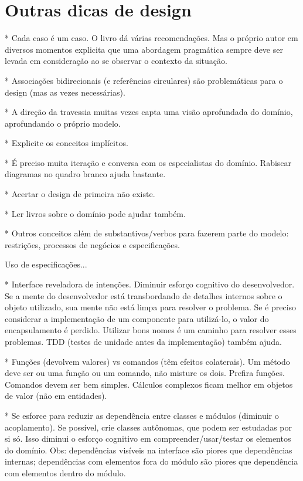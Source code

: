 \documentclass[a4paper, 12pt]{article}
\begin{document}
\section{Outras dicas de design}

* Cada caso é um caso. O livro dá várias recomendações. Mas o próprio autor em diversos momentos explicita que uma abordagem pragmática sempre deve ser levada em consideração ao se observar o contexto da situação.

* Associações bidirecionais (e referências circulares) são problemáticas para o design (mas as vezes necessárias).

* A direção da travessia muitas vezes capta uma visão aprofundada do domínio, aprofundando o próprio modelo. 

* Explicite os conceitos implícitos.

* É preciso muita iteração e conversa com os especialistas do domínio. Rabiscar diagramas no quadro branco ajuda bastante. 

* Acertar o design de primeira não existe.

* Ler livros sobre o domínio pode ajudar também.

* Outros conceitos além de substantivos/verbos para fazerem parte do modelo: restrições, processos de negócios e especificações.

Uso de especificações...

* Interface reveladora de intenções. Diminuir esforço cognitivo do desenvolvedor. Se a mente do desenvolvedor está transbordando de detalhes internos sobre o objeto utilizado, sua mente não está limpa para resolver o problema. Se é preciso considerar a implementação de um componente para utilizá-lo, o valor do encapsulamento é perdido. Utilizar bons nomes é um caminho para resolver esses problemas. TDD (testes de unidade antes da implementação) também ajuda.

* Funções (devolvem valores) vs comandos (têm efeitos colaterais). Um método deve ser ou uma função ou um comando, não misture os dois. Prefira funções. Comandos devem ser bem simples. Cálculos complexos ficam melhor em objetos de valor (não em entidades).

* Se esforce para reduzir as dependência entre classes e módulos (diminuir o acoplamento). Se possível, crie classes autônomas, que podem ser estudadas por si só. Isso diminui o esforço cognitivo em compreender/usar/testar os elementos do domínio. Obs: dependências visíveis na interface são piores que dependências internas; dependências com elementos fora do módulo são piores que dependência com elementos dentro do módulo.
\end{document}
